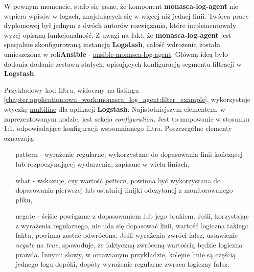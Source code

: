 W pewnym momencie, stało się jasne, że komponent \textbf{monasca-log-agent} nie wspiera wpisów w logach, znajdujących się w więcej
niż jednej linii. Twórca pracy dyplomowej był jednym z dwóch autorów rozwiązania, które implementowały wyżej opisaną funkcjonalność.
Z uwagi na fakt, że \textbf{monasca-log-agent} jest specjalnie skonfigurowaną instancją \textbf{Logstash}, całość wdrożenia została
umieszczona w roli\textbf{Ansible} - \href{https://github.com/FujitsuEnablingSoftwareTechnologyGmbH/ansible-monasca-log-agent}{ansible-monasca-log-agent}.
Główną ideą było dodania dodanie zestawu stałych, opisujących konfiguracją segmentu filtracji w \textbf{Logstash}.

Przykładowy kod filtru, widoczny na listingu \ref{chapter:application:own_work:monasca_log_agent:filter_example}, wykorzystuje wtyczkę
\href{https://www.elastic.co/guide/en/logstash/current/plugins-filters-multiline.html}{multiline} dla aplikacji \textbf{Logstash}.
Najistotniejszym elementem, w zaprezentowanym kodzie, jest sekcja \textit{configuration}. Jest to mapowanie w stosunku 1:1, odpowiadające
konfiguracji wspomnianego filtra. Poszczególne elementy oznaczają:
\begin{itemize}
    \item[pattern] - wyrażenie regularne, wykorzystane do dopasowania linii kończącej lub rozpoczynającej wydarzenia, zapisane w wielu liniach,
    \item[what] - wskazuje, czy wartość \textit{pattern}, powinna być wykorzystana do dopasowania pierwszej lub ostatniej linijki odczytanej
    z monitorowanego pliku,
    \item[negate] - ściśle powiązane z dopasowaniem lub jego brakiem. Jeśli, korzystając z wyrażenia regularnego, nie uda się dopasować linii,
    wartość logiczna takiego faktu, powinna zostać odwrócona. Jeśli wyrażenia zwróci fałsz, ustawienie \textit{negate} na \textit{true}, 
    spowoduje, że faktyczną zwróconą wartością będzie logiczna prawda. Innymi słowy, w omawianym przykładzie, kolejne linie są częścią jednego
    logu dopóki, dopóty wyrażenie regularne zwraca logiczny fałsz. 
\end{itemize}

